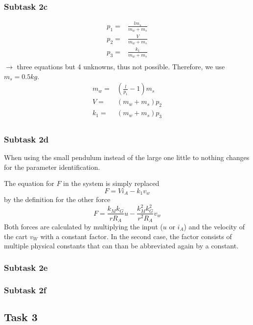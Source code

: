 \documentclass[a4paper, 12pt]{scrartcl}
\begin{document}
\subsubsection{Subtask 2c}
\begin{equation}
	\begin{split}
		p_1 = & \frac{l m_s}{m_w + m_s} \\
		p_2 = & \frac{V}{m_w + m_s} \\
		p_3 = & \frac{k_1}{m_w + m_s} \\
	\end{split}
\end{equation}
$\rightarrow$ three equations but 4 unknowns, thus not possible. Therefore, we use $m_s=0.5kg$. 
\begin{equation}
	\begin{split}
		m_w = & \left(\frac{l}{p_1} - 1\right)m_s \\
		V = & (m_w + m_s)p_2 \\
		k_1 = & (m_w + m_s)p_3 \\
	\end{split}
\end{equation}
\subsubsection{Subtask 2d}

When using the small pendulum instead of the large one little to nothing changes for the parameter identification. 

The equation for $F$ in the system is simply replaced
\begin{equation}
	F = V i_A - k_1 v_w
\end{equation}
by the definition for the other force 
\begin{equation}
	F = \frac{k_M k_G}{r R_A} u - \frac{k_M^2 k_G^2}{r^2 R_A} v_w
\end{equation}
Both forces are calculated by multiplying the input ($u$ or $i_A$) and the velocity of the cart $v_W$ with a constant factor. In the second case, the factor consists of multiple physical constants that can than be abbreviated again by a constant. 

\subsubsection{Subtask 2e}
\subsubsection{Subtask 2f}

\subsection{Task 3}
\end{document}

